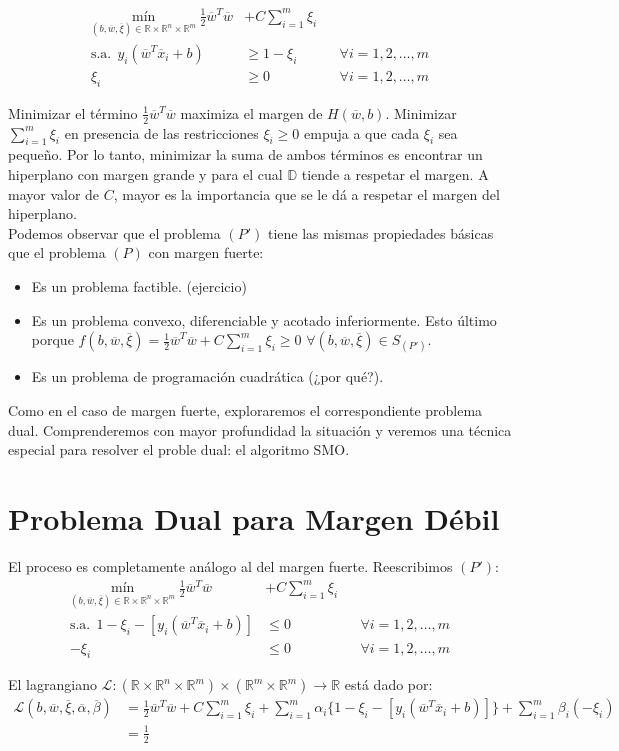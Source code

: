 \documentclass[11pt]{article}
\newcommand{\R}{\mathbb{R}}
\newcommand{\Rn}{\R^{n}}
\newcommand{\Rm}{\R^{m}}
\newcommand{\Runm}{\R\times\Rn\times\Rm}
\newcommand{\xiv}{\overline{\xi}}
\newcommand{\av}{\overline{\alpha}}
\newcommand{\bev}{\overline{\beta}}
\newcommand{\wv}{\overline{w}}
\newcommand{\x}{\overline{x}}
\newcommand{\Sm}{1,2,\ldots, m}
\newcommand{\La}{\mathcal{L}}
\newcommand{\Dat}{\mathbb{D}}
\newcommand{\ali}{\alpha_{i}}
\newcommand{\bei}{\beta_{i}}
\newcommand{\xii}{\xi_{i}}
\begin{document}
\begin{equation*}
\begin{aligned}
 \underset{(b,\wv, \xiv)\in \Runm}{\text{mín}}\ \frac{1}{2}\wv^{T}\wv&+C\sum_{i=1}^{m}\xi_{i}  \\
\text{s.a.}\ \
 y_{i}(\wv^{T}\x_{i}+b)&\geq1-\xi_{i}\ \ &&\forall i=\Sm\\
 \xi_{i}&\geq0\ \ &&\forall i=\Sm
\end{aligned}
\end{equation*}

Minimizar el término $\frac{1}{2}\wv^{T}\wv$ maximiza el margen de $H(\wv, b)$. Minimizar $\sum_{i=1}^{m}\xi_{i}$ en presencia de las restricciones $\xi_{i}\geq0$ empuja a que cada $\xi_{i}$ sea pequeño. Por lo tanto, minimizar la suma de ambos términos es encontrar un hiperplano con margen grande y para el cual $\Dat$ tiende a respetar el margen. A mayor valor de $C$, mayor es la importancia que se le dá a respetar el margen del hiperplano.\\

Podemos observar que el problema $(P')$ tiene las mismas propiedades básicas que el problema $(P)$ con margen fuerte:
\begin{itemize}
\item Es un problema factible. (ejercicio)
\item Es un problema convexo, diferenciable y acotado inferiormente. Esto último porque $f(b, \wv, \xiv)=\frac{1}{2}\wv^{T}\wv+C\sum_{i=1}^{m}\xi_{i}\geq0$ $\forall(b,\wv,\xiv)\in S_{(P')}$.
\item Es un problema de programación cuadrática (¿por qué?).
\end{itemize}

Como en el caso de margen fuerte, exploraremos el correspondiente problema dual. Comprenderemos con mayor profundidad la situación y veremos una técnica especial para resolver el proble dual: el algoritmo SMO.

\section{Problema Dual para Margen Débil}
El proceso es completamente análogo al del margen fuerte. Reescribimos $(P')$:
\begin{equation*}
\begin{aligned}
 \underset{(b,\wv, \xiv)\in \Runm}{\text{mín}}\ \frac{1}{2}\wv^{T}\wv&+C\sum_{i=1}^{m}\xi_{i}  \\
\text{s.a.}\ \
 1-\xi_{i}-[y_{i}(\wv^{T}\x_{i}+b)]&\leq0\ \ &&\forall i=\Sm\\
 -\xi_{i}&\leq0\ \ &&\forall i=\Sm
\end{aligned}
\end{equation*}

El lagrangiano $\La:(\R\times\Rn\times\Rm)\times(\Rm\times\Rm)\rightarrow\R$ está dado por:
\begin{equation*}
\begin{aligned}
\La(b, \wv, \xiv, \av, \bev)&=\frac{1}{2}\wv^{T}\wv+C\sum_{i=1}^{m}\xii+\sum_{i=1}^{m}\ali\{1-\xii-[y_{i}(\wv^{T}\x_{i}+b)]\}+\sum_{i=1}^{m}\bei(-\xii)\\
&=\frac{1}{2}
\end{aligned}
\end{equation*}
\end{document}
